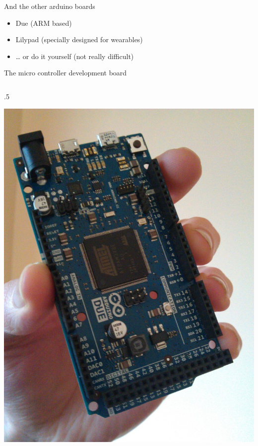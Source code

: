 \begin{frame}{And the other arduino boards}
	\begin{itemize}
		\item Due (ARM based)
		\item Lilypad (specially designed for wearables)
		\item … or do it yourself (not really difficult)
	\end{itemize}
\end{frame}

\begin{frame}{The micro controller development board}
	\begin{columns} [c,onlytextwidth]
		\begin{column} [c] {.5\textwidth}
			\begin{center}
				\includegraphics [width=.9\textwidth,keepaspectratio]{img/due}
			\end{center}
		\end{column}

\end{columns}
\end{frame}
